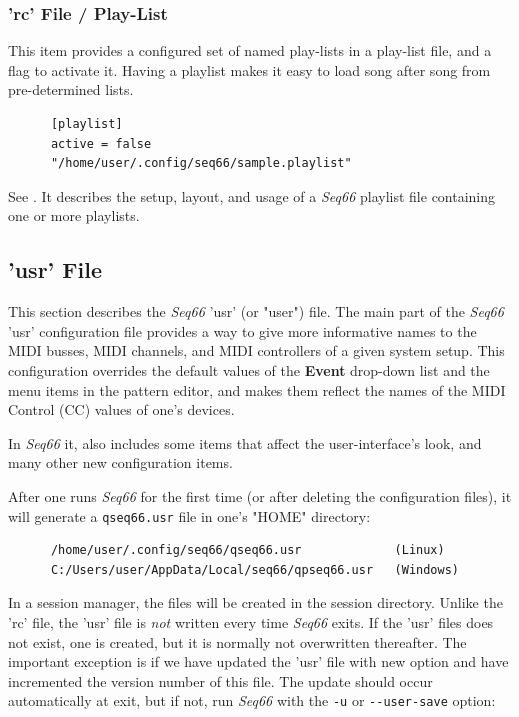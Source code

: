 \subsubsection{'rc' File / Play-List}
\label{subsubsec:configuration_rc_playlist}

   This item provides a configured set of named play-lists in a play-list file,
   and a flag to activate it.
   Having a playlist makes it easy to load song after song from pre-determined
   lists.
   
   \index{[playlist]}
   \begin{verbatim}
      [playlist]
      active = false
      "/home/user/.config/seq66/sample.playlist"
   \end{verbatim}

   See .
   It describes the setup, layout, and usage of a
   \textsl{Seq66} playlist file containing one or more playlists.

\subsection{'usr' File}
\label{subsec:configuration_usr}

   This section describes the \textsl{Seq66} 'usr' (or "user") file.
   The main part of the \textsl{Seq66} 'usr'
   configuration file provides a way to give more
   informative names to the MIDI busses, MIDI channels, and MIDI controllers of
   a given system setup.
   This configuration overrides the default values
   of the \textbf{Event} drop-down list and the menu items in the pattern editor,
   and makes them reflect the names of the MIDI Control (CC) values of one's
   devices.

   In \textsl{Seq66} it, also includes some items that affect the
   user-interface's look, and many other new configuration items.

   After one runs \textsl{Seq66} for the first time (or after deleting
   the configuration files), it will generate a
   \texttt{qseq66.usr} file in one's "HOME" directory:

   \begin{verbatim}
      /home/user/.config/seq66/qseq66.usr             (Linux)
      C:/Users/user/AppData/Local/seq66/qpseq66.usr   (Windows)
   \end{verbatim}

   In a session manager, the files will be created in the session directory.
   Unlike the 'rc' file, the 'usr' file is \textsl{not} written every time
   \textsl{Seq66} exits.  If the 'usr' files does not exist, one is
   created, but it is normally not overwritten thereafter.
   The important exception is if we have updated the 'usr' file with new option
   and have incremented the version number of this file.
   The update should occur automatically at exit, but if not,
   run \textsl{Seq66} with the
   \texttt{-u} or \texttt{-{}-user-save} option:

